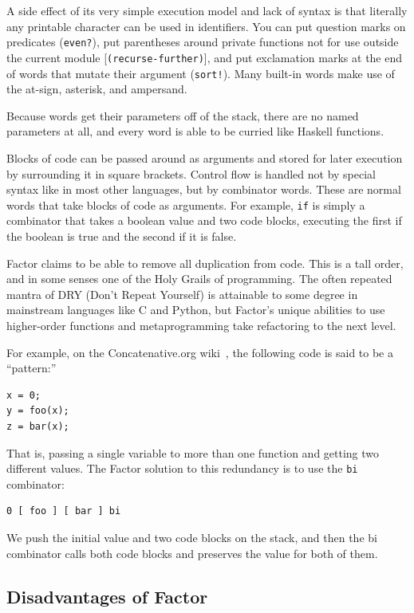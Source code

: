 \documentclass{article}
\begin{document}
A side effect of its very simple execution model and lack of syntax is that
literally any printable character can be used in identifiers.  You can put
question marks on predicates (\texttt{even?}), put parentheses around private functions
not for use outside the current module [\texttt{(recurse-further)}], and put
exclamation marks at the end of words that mutate their argument
(\texttt{sort!}).  Many built-in words make use of the at-sign, asterisk, and
ampersand.

Because words get their parameters off of the stack, there are no named
parameters at all, and every word is able to be curried like Haskell
functions.

Blocks of code can be passed around as arguments and stored for later execution
by surrounding it in square brackets.  Control flow is handled not by special
syntax like in most other languages, but by combinator words.  These are normal
words that take blocks of code as arguments.  For example, \texttt{if} is simply
a combinator that takes a boolean value and two code blocks, executing the first
if the boolean is true and the second if it is false.

Factor claims to be able to remove all duplication from code.  This is a tall
order, and in some senses one of the Holy Grails of programming.  The often
repeated mantra of DRY (Don't Repeat Yourself) is attainable to some degree in
mainstream languages like C and Python, but Factor's unique abilities to use
higher-order functions and metaprogramming take refactoring to the next level.

For example, on the Concatenative.org wiki~\cite{factorwiki}, the following code
is said to be a ``pattern:''

\begin{verbatim}
x = 0;
y = foo(x);
z = bar(x);
\end{verbatim}

That is, passing a single variable to more than one function and getting two
different values.  The Factor solution to this redundancy is to use the
\texttt{bi} combinator:

\begin{verbatim}
0 [ foo ] [ bar ] bi
\end{verbatim}

We push the initial value and two code blocks on the stack, and then the bi
combinator calls both code blocks and preserves the value for both of them.

\subsection{Disadvantages of Factor}
\end{document}
